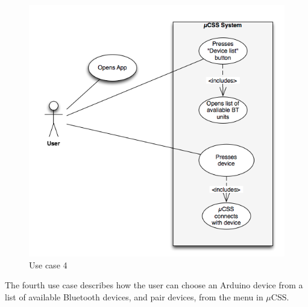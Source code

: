 \begin{figure}[H]
\centering
\includegraphics[scale=0.7]{images/UseCase7}
\caption{Use case 4}
\end{figure}

The fourth use case describes how the user can choose an Arduino device from a list of available Bluetooth devices, and pair devices, from the menu in $\mu$CSS. 


